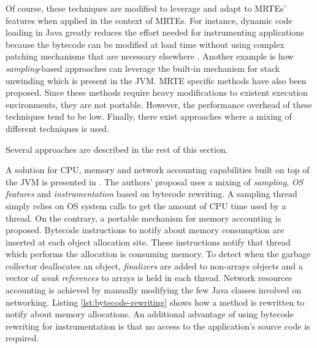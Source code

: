 Of course, these techniques are modified to leverage and adapt to MRTEs' features when applied in the context of MRTEs.
For instance, dynamic code loading in Java greatly reduces the effort needed for instrumenting applications because the bytecode can be modified at load time without using complex patching mechanisms that are necessary elsewhere \cite{Gregg:2011:DDT:1971960}.
Another example is how \textit{sampling}-based approaches can leverage the built-in mechanism for stack unwinding which is present in the JVM.
MRTE specific methods have also been proposed.
Since these methods require heavy modifications to existent execution environments, they are not portable.
However, the performance overhead of these techniques tend to be low.
Finally, there exist approaches where a mixing of different techniques is used.

Several approaches are described in the rest of this section.

A solution for CPU, memory and network accounting capabilities built on top of the JVM is presented in \cite{czajkowski_jres:_1998}.
The authors' proposal uses a mixing of \textit{sampling}, \textit{OS features} and \textit{instrumentation} based on bytecode rewriting.
A sampling thread simply relies on OS system calls to get the amount of CPU time used by a thread.
On the contrary, a portable mechanism for memory accounting is proposed.
Bytecode instructions to notify about memory consumption are inserted at each object allocation site.
These instructions notify that thread which performs the allocation is consuming memory.
To detect when the garbage collector deallocates an object, \textit{finalizers} are added to non-arrays objects and a vector of \textit{weak references} to arrays is held in each thread.
Network resources accounting is achieved by manually modifying the few Java classes involved on networking.
Listing \ref{lst:bytecode-rewriting} shows how a method is rewritten to notify about memory allocations.
An additional advantage of using bytecode rewriting for instrumentation is that no access to the application's source code is required.

